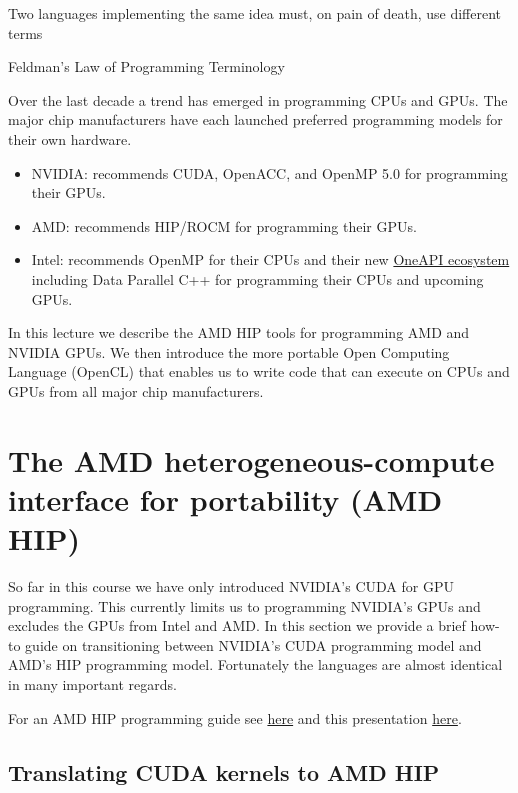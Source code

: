 

\epigraph{Two languages implementing the same idea must, on pain of death, use different terms}{Feldman's Law of Programming Terminology}

Over the last decade a trend has emerged in programming CPUs and GPUs. The major chip manufacturers have each launched preferred programming models for their own hardware. 

\begin{itemize}
    \item NVIDIA: recommends CUDA, OpenACC, and OpenMP 5.0 for programming their GPUs.
    \item AMD: recommends HIP/ROCM for programming their GPUs. 
    \item Intel: recommends OpenMP for their CPUs and their new \href{https://software.intel.com/en-us/oneapi}{OneAPI ecosystem} including Data Parallel C++ for programming their CPUs and upcoming GPUs.
\end{itemize} 

In this lecture we describe the AMD HIP tools for programming AMD and NVIDIA GPUs. We then introduce the more portable Open Computing Language (OpenCL) that enables us to write code that can execute on CPUs and GPUs from all major chip manufacturers.

\section{The AMD heterogeneous-compute interface for portability (AMD HIP)}

So far in this course we have only introduced NVIDIA's CUDA for GPU programming. This currently limits us to programming NVIDIA's GPUs and excludes the GPUs from Intel and AMD. In this section we provide a brief how-to guide on transitioning between NVIDIA's CUDA programming model and AMD's HIP programming model. Fortunately the languages are almost identical in many important regards. 

For an AMD HIP programming guide see \href{https://rocm-documentation.readthedocs.io/en/latest/Programming_Guides/HIP-GUIDE.html}{here} and this presentation \href{https://www.olcf.ornl.gov/wp-content/uploads/2019/09/AMD_GPU_HIP_training_20190906.pdf}{here}.

\subsection{Translating CUDA kernels to AMD HIP}

